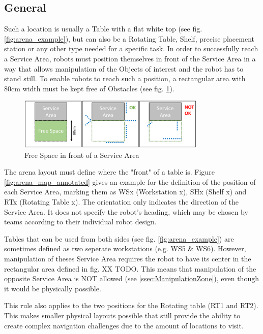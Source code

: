 \subsection{General} 
\label{subsec:Service_Areas_General}


Such a location is usually a Table with a flat white top (see fig. \ref{fig:arena_example}), but can also be a Rotating Table, Shelf, precise placement station or any other type needed for a specific task.
In order to successfully reach a Service Area, robots must position themselves in front of the Service Area in a way that allows manipulation of the Objects of interest and the robot has to stand still. To enable robots to reach such a position, a rectangular area with $80\si{\centi\meter}$ width must be kept free of Obstacles (see fig. \ref{fig:arena_service_area_free}). 

\begin{figure} [h!]
	\centering
	\includegraphics[width= 0.8\textwidth ]{./images/general_rules/arena_service_area_free_space}
	\caption{Free Space in front of a Service Area}
	\label{fig:arena_service_area_free}
\end{figure}

The arena layout must define where the "front" of a table is.
Figure \ref{fig:arena_map_annotated} gives an example for the definition of the position of each Service Area, marking them as WSx (Workstation x), SHx (Shelf x) and RTx (Rotating Table x). The orientation only indicates the direction of the Service Area. It does not specify the robot's heading, which may be chosen by teams according to their individual robot design.

Tables that can be used from both sides (see fig. \ref{fig:arena_example}) are sometimes defined as two seperate workstations (e.g. WS5 \& WS6). However, manipulation of theses Service Area requires the robot to have its center in the rectangular area defined in fig. XX TODO. This means that manipulation of the opposite Service Area is NOT allowed (see \ref{ssec:ManipulationZone}), even though it would be physically possible.

This rule also applies to the two positions for the Rotating table (RT1 and RT2).
This makes smaller physical layouts possible that still provide the ability to create complex navigation challenges due to the amount of locations to visit.



